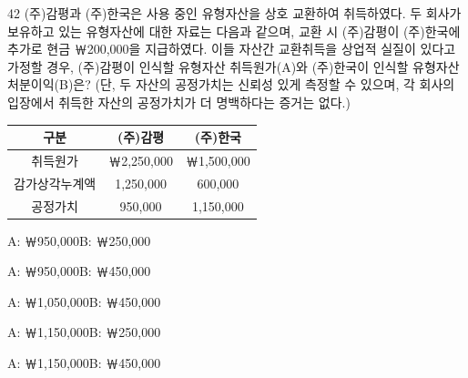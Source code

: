 \begin{question}{42}
(주)감평과 (주)한국은 사용 중인 유형자산을 상호 교환하여 취득하였다. 두 회사가 보유하고 있는 유형자산에 대한 자료는 다음과 같으며, 교환 시 (주)감평이 (주)한국에 추가로 현금 ￦200,000을 지급하였다. 이들 자산간 교환취득을 상업적 실질이 있다고 가정할 경우, (주)감평이 인식할 유형자산 취득원가(A)와 (주)한국이 인식할 유형자산처분이익(B)은? (단, 두 자산의 공정가치는 신뢰성 있게 측정할 수 있으며, 각 회사의 입장에서 취득한 자산의 공정가치가 더 명백하다는 증거는 없다.) \par
{\small\centering
\begin{tabular}{|c|c|c|}
\hline
구분 & (주)감평 & (주)한국 \\
\hline
취득원가 & ￦2,250,000 & ￦1,500,000 \\
감가상각누계액 & 1,250,000 & 600,000 \\
공정가치 & 950,000 & 1,150,000 \\
\hline
\end{tabular}\par}

\begin{choices}
  \item A: ￦950,000\hspace{2em}B: ￦250,000
  \item A: ￦950,000\hspace{2em}B: ￦450,000
  \item A: ￦1,050,000\hspace{2em}B: ￦450,000
  \item A: ￦1,150,000\hspace{2em}B: ￦250,000
  \item A: ￦1,150,000\hspace{2em}B: ￦450,000
\end{choices}
\end{question}
